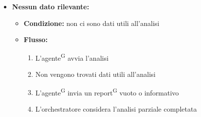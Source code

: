 \documentclass[a4paper, 11pt]{article}
\begin{document}
\begin{itemize}
\begin{itemize}
\begin{itemize}
\begin{enumerate}
					\item L'agente\textsuperscript{G} avvia l'analisi
					\item Si verifica un errore
					\item L'agente\textsuperscript{G} genera un report\textsuperscript{G} di errore
					\item Il report\textsuperscript{G} viene inviato all'orchestratore
				\end{enumerate}
			\end{itemize}
		\item \textbf{Nessun dato rilevante:} 
			\begin{itemize}
				\item \textbf{Condizione:} non ci sono dati utili all'analisi
				\item \textbf{Flusso:} 
				\begin{enumerate}
					\item L'agente\textsuperscript{G} avvia l'analisi
					\item Non vengono trovati dati utili all'analisi
					\item L'agente\textsuperscript{G} invia un report\textsuperscript{G} vuoto o informativo
					\item L'orchestratore considera l'analisi parziale completata
				\end{enumerate}
			\end{itemize}
	\end{itemize}
\end{itemize}
\end{document}
